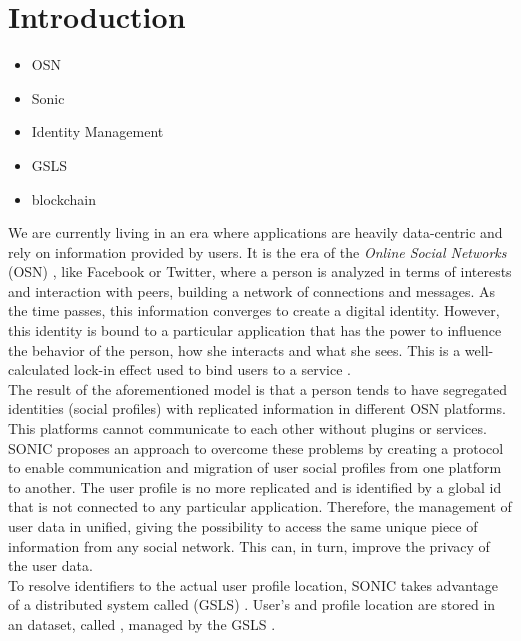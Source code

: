 \section{Introduction}
\label{S:1}

\begin{itemize}
  \item OSN
  \item Sonic
  \item Identity Management
  \item GSLS
  \item blockchain
\end{itemize}

We are currently living in an era where applications are heavily data-centric and rely on information provided by users. It is the era of the \textit{Online Social Networks} (OSN) \cite{gondor_sonic:_2014}, like Facebook or Twitter, where a person is analyzed in terms of interests and interaction with peers, building a network of connections and messages. As the time passes, this information converges to create a digital identity. However, this identity is bound to a particular application that has the power to influence the behavior of the person, how she interacts and what she sees. This is a well-calculated lock-in effect used to bind users to a service \cite{gondor_distributed_2016}. 
\\

The result of the aforementioned model is that a person tends to have segregated identities (social profiles) with replicated information in different OSN platforms. This platforms cannot communicate to each other without plugins or services. SONIC proposes an approach to overcome these problems by creating a protocol to enable communication and migration of user social profiles from one platform to another. The user profile is no more replicated and is identified by a global id that is not connected to any particular application. Therefore, the management of user data in unified, giving the possibility to access the same unique piece of information from any social network. This can, in turn, improve the privacy of the user data. 
\\

To resolve identifiers to the actual user profile location, SONIC takes advantage of a distributed system called (GSLS) \cite{gondor_distributed_2016}. User's  and profile location are stored in an dataset, called , managed by the GSLS \cite{gondor_distributed_2016}.
\\

